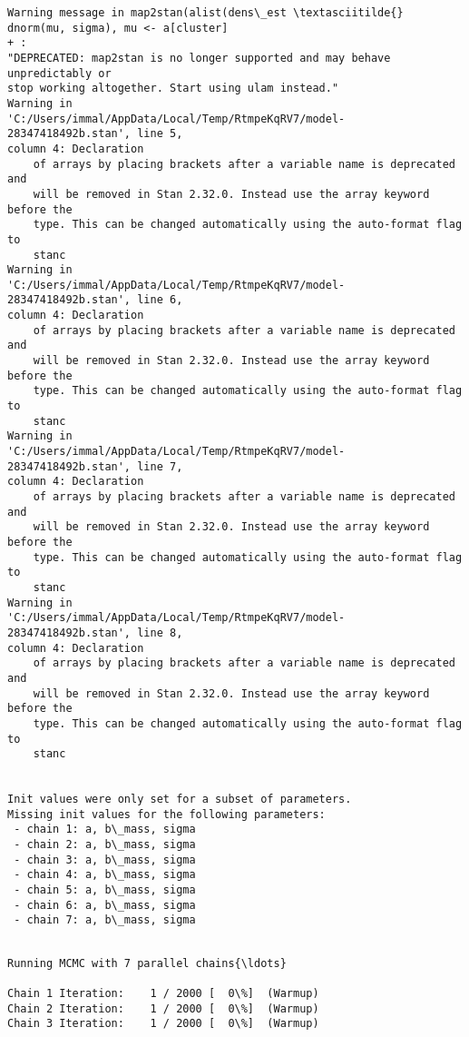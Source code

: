 \documentclass[11pt]{article}
\begin{document}
    \begin{Verbatim}[commandchars=\\\{\}]
Warning message in map2stan(alist(dens\_est \textasciitilde{} dnorm(mu, sigma), mu <- a[cluster]
+ :
"DEPRECATED: map2stan is no longer supported and may behave unpredictably or
stop working altogether. Start using ulam instead."
Warning in
'C:/Users/immal/AppData/Local/Temp/RtmpeKqRV7/model-28347418492b.stan', line 5,
column 4: Declaration
    of arrays by placing brackets after a variable name is deprecated and
    will be removed in Stan 2.32.0. Instead use the array keyword before the
    type. This can be changed automatically using the auto-format flag to
    stanc
Warning in
'C:/Users/immal/AppData/Local/Temp/RtmpeKqRV7/model-28347418492b.stan', line 6,
column 4: Declaration
    of arrays by placing brackets after a variable name is deprecated and
    will be removed in Stan 2.32.0. Instead use the array keyword before the
    type. This can be changed automatically using the auto-format flag to
    stanc
Warning in
'C:/Users/immal/AppData/Local/Temp/RtmpeKqRV7/model-28347418492b.stan', line 7,
column 4: Declaration
    of arrays by placing brackets after a variable name is deprecated and
    will be removed in Stan 2.32.0. Instead use the array keyword before the
    type. This can be changed automatically using the auto-format flag to
    stanc
Warning in
'C:/Users/immal/AppData/Local/Temp/RtmpeKqRV7/model-28347418492b.stan', line 8,
column 4: Declaration
    of arrays by placing brackets after a variable name is deprecated and
    will be removed in Stan 2.32.0. Instead use the array keyword before the
    type. This can be changed automatically using the auto-format flag to
    stanc


Init values were only set for a subset of parameters.
Missing init values for the following parameters:
 - chain 1: a, b\_mass, sigma
 - chain 2: a, b\_mass, sigma
 - chain 3: a, b\_mass, sigma
 - chain 4: a, b\_mass, sigma
 - chain 5: a, b\_mass, sigma
 - chain 6: a, b\_mass, sigma
 - chain 7: a, b\_mass, sigma


    \end{Verbatim}

    \begin{Verbatim}[commandchars=\\\{\}]
Running MCMC with 7 parallel chains{\ldots}

Chain 1 Iteration:    1 / 2000 [  0\%]  (Warmup)
Chain 2 Iteration:    1 / 2000 [  0\%]  (Warmup)
Chain 3 Iteration:    1 / 2000 [  0\%]  (Warmup)
    \end{Verbatim}
\end{document}
